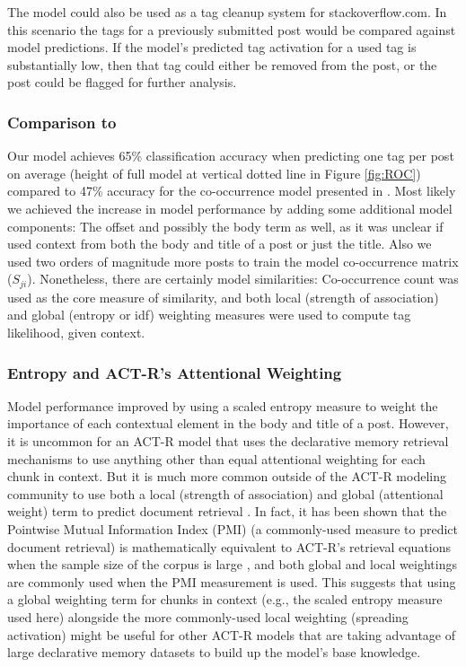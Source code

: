 \documentclass[10pt,letterpaper]{article}
\begin{document}
The model could also be used as a tag cleanup system for stackoverflow.com.
In this scenario the tags for a previously submitted post would be compared against model predictions.
If the model's predicted tag activation for a used tag is substantially low, then that tag could either be removed from the post, or the post could be flagged for further analysis.

\subsubsection{Comparison to }

Our model achieves 65\% classification accuracy when predicting one tag per post on average
(height of full model at vertical dotted line in Figure \ref{fig:ROC})
compared to 47\% accuracy for the co-occurrence model presented in .
Most likely we achieved the increase in model performance by adding some additional model components:
The offset and possibly the body term as well,
as it was unclear if \citeauthor{Kuo2011} used context from both the body and title of a post or just the title.
Also we used two orders of magnitude more posts to train the model co-occurrence matrix ($S_{ji}$).
Nonetheless, there are certainly model similarities:
Co-occurrence count was used as the core measure of similarity, and both local (strength of association) and global (entropy or idf) weighting measures were used to compute tag likelihood, given context.

\subsubsection{Entropy and ACT-R's Attentional Weighting}

Model performance improved by using a scaled entropy measure to weight the importance of each contextual element in the body and title of a post.
However, it is uncommon for an ACT-R model that uses the declarative memory retrieval mechanisms to use anything other than equal attentional weighting for each chunk in context.
But it is much more common outside of the ACT-R modeling community to use both a local (strength of association) and global (attentional weight) term to predict document retrieval \cite{Dumais1991}.
In fact, it has been shown that the Pointwise Mutual Information Index (PMI) (a commonly-used measure to predict document retrieval)
is mathematically equivalent to ACT-R's retrieval equations when the sample size of the corpus is large \cite{Budiu2007, Farahat2004},
and both global and local weightings are commonly used when the PMI measurement is used.
This suggests that using a global weighting term for chunks in context (e.g., the scaled entropy measure used here)
alongside the more commonly-used local weighting (spreading activation) might be useful for other ACT-R models that are taking advantage of large declarative memory datasets to build up the model's base knowledge.
\end{document}
